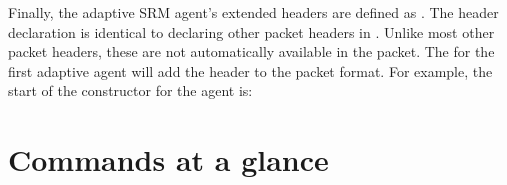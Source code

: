 Finally, the adaptive SRM agent's extended headers are defined as
.
The header declaration is identical to declaring other packet headers in \ns.
Unlike most other packet headers, 
these are not automatically available in the packet.
The
for the first adaptive agent
will add the header to the packet format.
For example, the start of the constructor for the
 agent is:

\section{Commands at a glance}
\label{sec:srmcommand}

